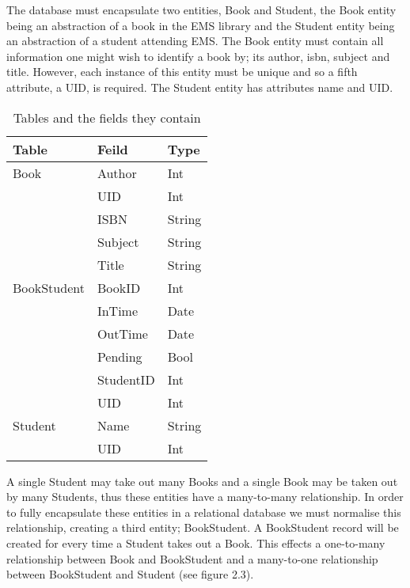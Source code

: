 \documentclass[draft]{book}
\begin{document}
The database must encapsulate two entities, Book and Student, the Book entity
being an abstraction of a book in the EMS library and the Student entity being
an abstraction of a student attending EMS. The Book entity must contain all
information one might wish to identify a book by; its author, isbn, subject and
title. However, each instance of this entity must be unique and so a fifth
attribute, a UID, is required. The Student entity has attributes name and UID.

\begin{table}[t]

    \centering

    \begin{tabu} to 0.7\linewidth {lXX}

        \toprule

        Table       & Feild     & Type   \\

        \midrule

        Book        & Author    & Int    \\
                    & UID       & Int    \\
                    & ISBN      & String \\
                    & Subject   & String \\
                    & Title     & String \\
        
        BookStudent & BookID    & Int    \\
                    & InTime    & Date   \\
                    & OutTime   & Date   \\
                    & Pending   & Bool   \\
                    & StudentID & Int    \\
                    & UID       & Int    \\
        Student     & Name      & String \\
                    & UID       & Int    \\
        
        \bottomrule

    \end{tabu}

    \caption[Data Dictionary]{Tables and the fields they contain}

\end{table}

A single Student may take out many Books and a single Book may be taken out by
many Students, thus these entities have a many-to-many relationship. In order to
fully encapsulate these entities in a relational database we must normalise this
relationship, creating a third entity; BookStudent. A BookStudent record will be
created for every time a Student takes out a Book. This effects a one-to-many
relationship between Book and BookStudent and a many-to-one relationship between
BookStudent and Student (see figure 2.3).
\end{document}
